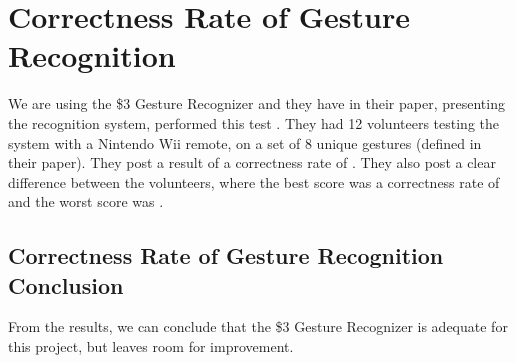 \section{Correctness Rate of Gesture Recognition}\label{sec:gesturecorrectness}
We are using the \$3 Gesture Recognizer and they have in their paper, 
presenting the recognition system, performed this test \cite{threedollar}.
They had \num{12} volunteers testing the system with a Nintendo Wii remote, 
on a set of \num{8} unique gestures (defined in their paper).
They post a result of a correctness rate of . 
They also post a clear difference between the volunteers, 
where the best score was a correctness rate of  and the worst score was . 
\subsection{Correctness Rate of Gesture Recognition Conclusion}
From the results, we can conclude that the \$3 Gesture Recognizer is adequate for this project, but leaves room for improvement. 
